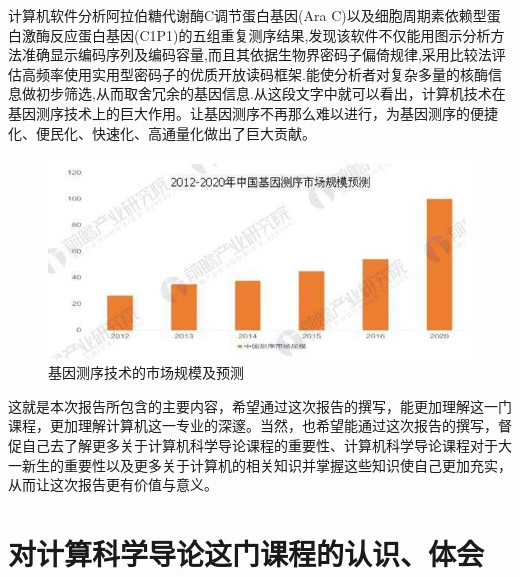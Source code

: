 \documentclass{article}
\begin{document}
计算机软件分析阿拉伯糖代谢酶C调节蛋白基因(Ara C)以及细胞周期素依赖型蛋白激酶反应蛋白基因(C1P1)的五组重复测序结果,发现该软件不仅能用图示分析方法准确显示编码序列及编码容量,而且其依据生物界密码子偏倚规律,采用比较法评估高频率使用实用型密码子的优质开放读码框架.能使分析者对复杂多量的核酶信息做初步筛选,从而取舍冗余的基因信息.\citep {a}从这段文字中就可以看出，计算机技术在基因测序技术上的巨大作用。让基因测序不再那么难以进行，为基因测序的便捷化、便民化、快速化、高通量化做出了巨大贡献。\par 
\begin{figure}[H]
	\centering
	\includegraphics[scale=0.7]{jiyincexushichangguimoyuce}
	\caption{基因测序技术的市场规模及预测}
	\label{fig:jiyincexushichangguimoyuce}
\end{figure}
这就是本次报告所包含的主要内容，希望通过这次报告的撰写，能更加理解这一门课程，更加理解计算机这一专业的深邃。当然，也希望能通过这次报告的撰写，督促自己去了解更多关于计算机科学导论课程的重要性、计算机科学导论课程对于大一新生的重要性以及更多关于计算机的相关知识并掌握这些知识使自己更加充实，从而让这次报告更有价值与意义。\par 

\section{对计算科学导论这门课程的认识、体会}
 
\end{document}
